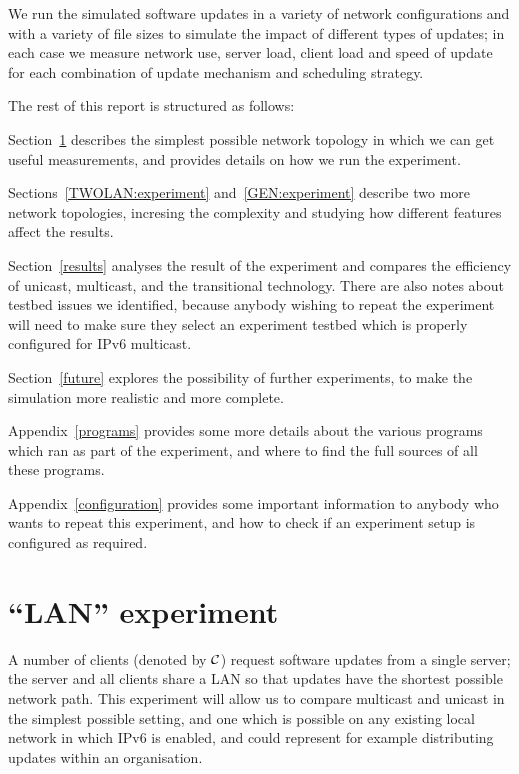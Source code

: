 \documentclass[a4paper,11pt,twocolumn]{article}
\begin{document}
We run the simulated software updates in a variety of network
configurations and with a variety of file sizes to simulate the
impact of different types of updates; in each case we measure network
use, server load, client load and speed of update for each combination
of update mechanism and scheduling strategy.

The rest of this report is structured as follows:

Section~\ref{LAN:experiment} describes the simplest possible network
topology in which we can get useful measurements, and provides details
on how we run the experiment.

Sections~\ref{TWOLAN:experiment} and~\ref{GEN:experiment} describe
two more network topologies, incresing the complexity and studying
how different features affect the results.

Section~\ref{results} analyses the result of the experiment and compares
the efficiency of unicast, multicast, and the transitional technology.
There are also notes about testbed issues we identified, because anybody
wishing to repeat the experiment will need to make sure they select
an experiment testbed which is properly configured for IPv6 multicast.

Section~\ref{future} explores the possibility of further experiments,
to make the simulation more realistic and more complete.

Appendix~\ref{programs} provides some more details about the various
programs which ran as part of the experiment, and where to find the
full sources of all these programs.

Appendix~\ref{configuration} provides some important information to
anybody who wants to repeat this experiment, and how to check if
an experiment setup is configured as required.

\section{``LAN'' experiment}
\label{LAN:experiment}

A number of clients (denoted by ${\cal C}$) request software updates
from a single server; the server and all clients share a LAN
so that updates have the shortest possible network path.  This
experiment will allow us to compare multicast and unicast in the
simplest possible setting, and one which is possible on any existing
local network in which IPv6 is enabled, and could represent for example
distributing updates within an organisation.
\end{document}
